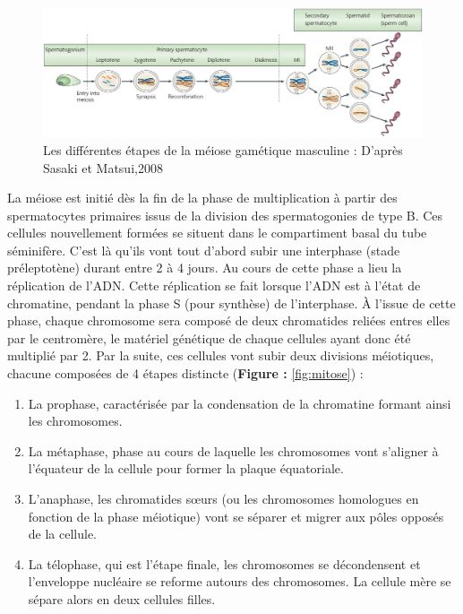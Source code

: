 \documentclass[12pt,twoside]{reedthesis}
\providecommand{\tightlist}{%
  \setlength{\itemsep}{0pt}\setlength{\parskip}{0pt}}
\theoremstyle{definition}
\theoremstyle{definition}
\theoremstyle{remark}
\begin{document}
  \begin{figure}
  
  {\centering \includegraphics[scale=0.35]{figure/Meiosis_Stages} 
  
  }
  
  \caption[Les différentes étapes de la méiose gamétique masculine]{Les différentes étapes de la méiose gamétique masculine : D’après Sasaki et Matsui,2008}\label{fig:meiose}
  \end{figure}
  
  La méiose est initié dès la fin de la phase de multiplication à partir
  des spermatocytes primaires issus de la division des spermatogonies de
  type B. Ces cellules nouvellement formées se situent dans le
  compartiment basal du tube séminifère. C'est là qu'ils vont tout d'abord
  subir une interphase (stade préleptotène) durant entre 2 à 4 jours. Au
  cours de cette phase a lieu la réplication de l'ADN. Cette réplication
  se fait lorsque l'ADN est à l'état de chromatine, pendant la phase S
  (pour synthèse) de l'interphase. À l'issue de cette phase, chaque
  chromosome sera composé de deux chromatides reliées entres elles par le
  centromère, le matériel génétique de chaque cellules ayant donc été
  multiplié par 2. Par la suite, ces cellules vont subir deux divisions
  méiotiques, chacune composées de 4 étapes distincte (\textbf{Figure :
  }\ref{fig:mitose}) :
  
  \begin{enumerate}
  \def\labelenumi{\arabic{enumi}.}
  \tightlist
  \item
    La prophase, caractérisée par la condensation de la chromatine formant
    ainsi les chromosomes.\\
  \item
    La métaphase, phase au cours de laquelle les chromosomes vont
    s'aligner à l'équateur de la cellule pour former la plaque
    équatoriale.
  \item
    L'anaphase, les chromatides sœurs (ou les chromosomes homologues en
    fonction de la phase méiotique) vont se séparer et migrer aux pôles
    opposés de la cellule.\\
  \item
    La télophase, qui est l'étape finale, les chromosomes se décondensent
    et l'enveloppe nucléaire se reforme autours des chromosomes. La
    cellule mère se sépare alors en deux cellules filles.
  \end{enumerate}
  
\end{document}
